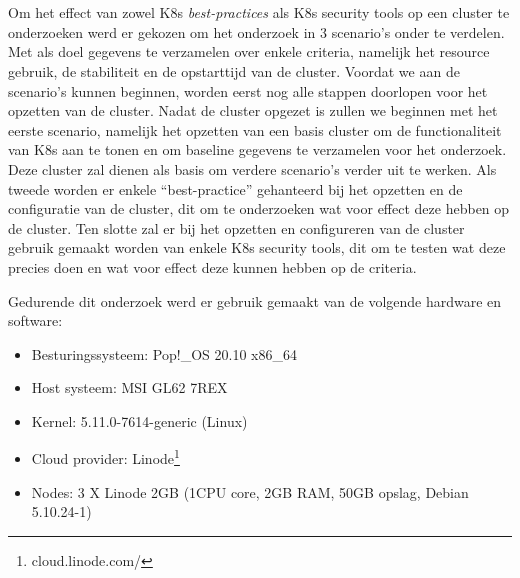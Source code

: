 
\chapter{}
\label{ch:methodologie}

Om het effect van zowel K8s \textit{best-practices} als K8s security tools op een cluster te onderzoeken werd er gekozen om het onderzoek in 3 scenario's onder te verdelen. Met als doel gegevens te verzamelen over enkele criteria, namelijk het resource gebruik, de stabiliteit en de opstarttijd van de cluster. Voordat we aan de scenario's kunnen beginnen, worden eerst nog alle stappen doorlopen voor het opzetten van de cluster. Nadat de cluster opgezet is zullen we beginnen met het eerste scenario, namelijk het opzetten van een basis cluster om de functionaliteit van K8s aan te tonen en om baseline gegevens te verzamelen voor het onderzoek. Deze cluster zal dienen als basis om verdere scenario's verder uit te werken. Als tweede worden er enkele ``best-practice'' gehanteerd bij het opzetten en de configuratie van de cluster, dit om te onderzoeken wat voor effect deze hebben op de cluster. Ten slotte zal er bij het opzetten en configureren van de cluster gebruik gemaakt worden van enkele K8s security tools, dit om te testen wat deze precies doen en wat voor effect deze kunnen hebben op de criteria. 

Gedurende dit onderzoek werd er gebruik gemaakt van de volgende hardware en software:

\begin{itemize}
	\item Besturingssysteem: Pop!\_OS 20.10 x86\_64
	\item Host systeem: MSI GL62 7REX
	\item Kernel: 5.11.0-7614-generic (Linux)
	\item Cloud provider: Linode\footnote{cloud.linode.com/}
	\item Nodes: 3 X Linode 2GB (1CPU core, 2GB RAM, 50GB opslag, Debian 5.10.24-1)
\end{itemize}


